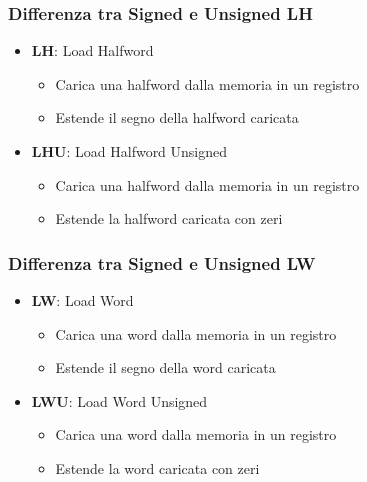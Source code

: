 \documentclass[12pt]{article} %
\begin{document}
\subsubsection{Differenza tra Signed e Unsigned LH}
\begin{itemize}
    \item \textbf{LH}: Load Halfword
    \begin{itemize}
        \item Carica una halfword dalla memoria in un registro
        \item Estende il segno della halfword caricata
    \end{itemize}
    \item \textbf{LHU}: Load Halfword Unsigned
    \begin{itemize}
        \item Carica una halfword dalla memoria in un registro
        \item Estende la halfword caricata con zeri
    \end{itemize}
\end{itemize}
\subsubsection{Differenza tra Signed e Unsigned LW}
\begin{itemize}
    \item \textbf{LW}: Load Word
    \begin{itemize}
        \item Carica una word dalla memoria in un registro
        \item Estende il segno della word caricata
    \end{itemize}
    \item \textbf{LWU}: Load Word Unsigned
    \begin{itemize}
        \item Carica una word dalla memoria in un registro
        \item Estende la word caricata con zeri
    \end{itemize}
\end{itemize}
\end{document}
